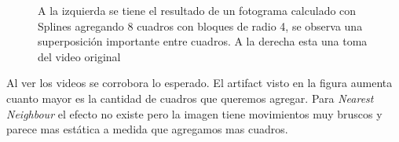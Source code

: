 \begin{figure}[H]
\centering
\begin{minipage}{0.48\textwidth}
\end{minipage}%
\hfill
\begin{minipage}{0.48\textwidth}   

\end{minipage}
\caption{\footnotesize A la izquierda se tiene el resultado de un fotograma calculado con Splines agregando 8 cuadros con bloques de radio 4, se observa una superposición importante entre cuadros. A la derecha esta una toma del video original}
\end{figure}


Al ver los videos se corrobora lo esperado. El artifact visto en la figura aumenta cuanto mayor es la cantidad de cuadros que queremos agregar. Para \textit{Nearest Neighbour} el efecto no existe pero la imagen tiene movimientos muy bruscos y parece mas estática a medida que agregamos mas cuadros.

